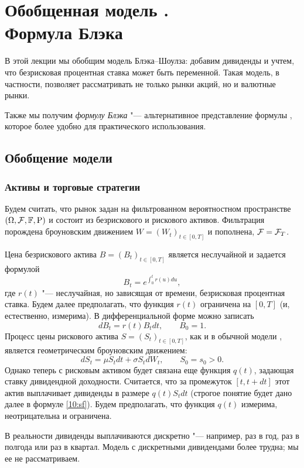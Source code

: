 \chapter[Обобщенная модель \bs. Формула Блэка]{Обобщенная модель \bs.\\Формула Блэка}
\label{ch:bs2}
\chaptertoc

В этой лекции мы обобщим модель Блэка--Шоулза: добавим дивиденды и учтем, что безрисковая процентная ставка может быть переменной.
Такая модель, в частности, позволяет рассматривать не только рынки акций, но и валютные рынки.

Также мы получим \emph{формулу Блэка} "--- альтернативное представление формулы \bs, которое более удобно для практического использования.


\section{Обобщение модели \bs}
\subsection{Активы и торговые стратегии}

Будем считать, что рынок задан на фильтрованном вероятностном пространстве $(\Omega, \mathcal{F}, \mathbb{F}, \mathrm{P})$ и состоит из безрискового и рискового активов.
Фильтрация порождена броуновским движением $W=(W_t)_{t\in[0,T]}$ и пополнена, $\mathcal{F} = \mathcal{F}_T$.

Цена безрискового актива $B=(B_t)_{t\in[0,T]}$ является неслучайной и задается формулой
\[
B_t = e^{\int_0^t r(u) du},
\]
где $r(t)$ "--- неслучайная, но зависящая от времени, безрисковая процентная ставка.
Будем далее предполагать, что функция $r(t)$ ограничена на $[0,T]$ (и, естественно, измерима).
В дифференциальной форме можно записать
\[
dB_t = r(t) B_t dt, \qquad B_0=1.
\]
Процесс цены рискового актива $S=(S_t)_{t\in[0,T]}$, как и в обычной модели \bs, является геометрическим броуновским движением:
\[
d S_t = \mu S_t dt + \sigma S_t d W_t, \qquad S_0=s_0 >0.
\]
Однако теперь с рисковым активом будет связана еще функция $q(t)$, задающая ставку дивидендной доходности.
Считается, что за промежуток $[t,t+dt]$ этот актив выплачивает дивиденды в размере $q(t)S_t dt$ (строгое понятие будет дано далее в формуле \eqref{10:sf}).
Будем предполагать, что функция $q(t)$ измерима, неотрицательна и ограничена.

\begin{remark}
В реальности дивиденды выплачиваются дискретно "--- например, раз в год, раз в полгода или раз в квартал.
Модель с дискретными дивидендами более трудна; мы ее не рассматриваем.
\end{remark}

